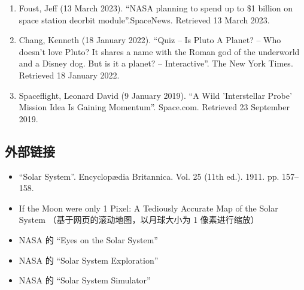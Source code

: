 \begin{enumerate}
\item Foust, Jeff (13 March 2023). ``NASA planning to spend up to \$1 billion on space station deorbit module''.SpaceNews. Retrieved 13 March 2023.
\item Chang, Kenneth (18 January 2022). ``Quiz – Is Pluto A Planet? – Who doesn't love Pluto? It shares a name with the Roman god of the underworld and a Disney dog. But is it a planet? – Interactive''. The New York Times. Retrieved 18 January 2022.
\item Spaceflight, Leonard David (9 January 2019). ``A Wild 'Interstellar Probe' Mission Idea Is Gaining Momentum''. Space.com. Retrieved 23 September 2019.
\end{enumerate}
\subsection{外部链接}
\begin{itemize}
\item ``Solar System''. Encyclopædia Britannica. Vol. 25 (11th ed.). 1911. pp. 157–158.
\item If the Moon were only 1 Pixel: A Tediously Accurate Map of the Solar System （基于网页的滚动地图，以月球大小为 1 像素进行缩放）
\item NASA 的 “Eyes on the Solar System”
\item NASA 的 “Solar System Exploration”
\item NASA 的 “Solar System Simulator”
\end{itemize}

